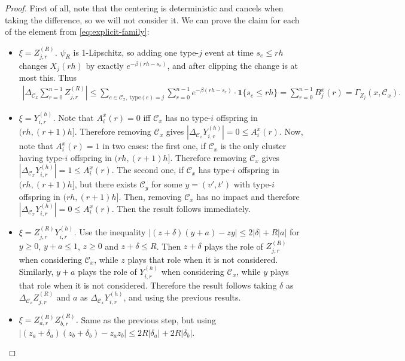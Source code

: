 \documentclass{article}
\begin{document}
\begin{proof}
First of all, note that the centering is deterministic and cancels when taking the difference, so we will not consider it. We can prove the claim for each of the element from \eqref{eq:explicit-family}:
\begin{itemize}
\item \emph{$\xi=Z_{j,r}^{(R)}$.} $\psi_R$ is 1-Lipschitz, so adding one type-$j$ event at time $s_e \le rh$ changes $X_j(rh)$ by exactly $e^{-\beta(rh-s_e)}$, and after clipping the change is at most this. Thus
\begin{align*}
    \left|\Delta_{\mathcal C_x}\sum_{r=0}^{n-1}Z_{j,r}^{(R)}\right| \le \sum_{e\in\mathcal C_x,\ \mathrm{type}(e)=j} \sum_{r=0}^{n-1} e^{-\beta(rh-s_e)}\cdot \textbf{1}\{s_e\le rh\} = \sum_{r=0}^{n-1} B_j^x(r)= \Gamma_{Z_j}(x,\mathcal C_x). 
\end{align*}
\item \emph{$\xi=Y_{i,r}^{(h)}$.} Note that $A_i^x(r)=0$ iff $\mathcal C_x$ has no type-$i$ offspring in $(rh,(r+1)h]$. Therefore removing $\mathcal C_x$ gives $|\Delta _{\mathcal C_x}Y_{i,r}^{(h)}|=0\le A_i^x(r)$. Now, note that $A_i^x(r)=1$ in two cases: the first one, if $\mathcal C_x$ is the only cluster having type-$i$ offspring in $(rh,(r+1)h]$. Therefore removing $\mathcal C_x$ gives $|\Delta _{\mathcal C_x}Y_{i,r}^{(h)}|=1\le A_i^x(r)$. The second one, if  $\mathcal C_x$ has type-$i$ offspring in $(rh,(r+1)h]$, but there exists $\mathcal C_y$ for some $y=(v',t')$ with type-$i$ offspring in $(rh,(r+1)h]$. Then, removing $\mathcal C_x$ has no impact and therefore $|\Delta _{\mathcal C_x}Y_{i,r}^{(h)}|=0\le A_i^x(r)$. Then the result follows immediately. 
\item \emph{$\xi=Z_{j,r}^{(R)}Y_{i,r}^{(h)}$.} Use the inequality $|(z+\delta)(y+a)-zy|\le 2|\delta|+R|a|$ for $y\ge0$, $y+a\le1$, $z\ge0$ and $z+\delta\le R$. Then $z+\delta$ plays the role of $Z_{j,r}^{(R)}$ when considering $\mathcal C_x$, while $z$ plays that role when it is not considered. Similarly, $y+a$  plays the role of $Y_{i,r}^{(h)}$ when considering $\mathcal C_x$, while $y$ plays that role when it is not considered. Therefore the result follows taking $\delta$ as $\Delta_{\mathcal C_x}Z_{j,r}^{(R)}$ and $a$ as $\Delta _{\mathcal C_x}Y_{i,r}^{(h)}$, and using the previous results.
\item \emph{$\xi=Z_{a,r}^{(R)}Z_{b,r}^{(R)}$.} Same as the previous step, but using $|(z_a+\delta_a)(z_b+\delta_b)-z_az_b|\le 2R|\delta_a| + 2R|\delta_b|$.
\end{itemize}
\end{proof}
\end{document}
